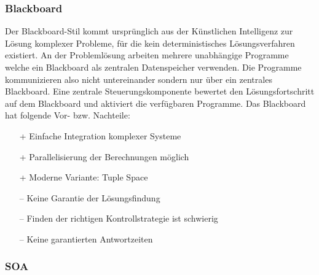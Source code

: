\subsubsection{Blackboard}

Der Blackboard-Stil kommt ursprünglich aus der Künstlichen Intelligenz zur Lösung komplexer Probleme, für die kein deterministisches Lösungsverfahren existiert. An der Problemlösung arbeiten mehrere unabhängige Programme welche ein Blackboard als zentralen Datenspeicher verwenden. Die Programme kommunizieren also nicht untereinander sondern nur über ein zentrales Blackboard. Eine zentrale Steuerungskomponente bewertet den Lösungsfortschritt auf dem Blackboard und aktiviert die verfügbaren Programme. Das Blackboard hat folgende Vor- bzw. Nachteile:
\begin{itemize}
	\item[+] Einfache Integration komplexer Systeme
	\item[+] Parallelisierung der Berechnungen möglich
	\item[+] Moderne Variante: Tuple Space
	\item[--] Keine Garantie der Lösungsfindung
	\item[--] Finden der richtigen Kontrollstrategie ist schwierig
	\item[--] Keine garantierten Antwortzeiten
\end{itemize}

\subsubsection{SOA}

